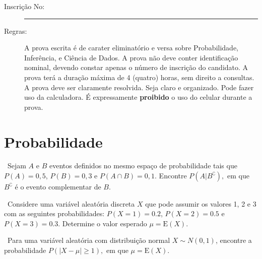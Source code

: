 \documentclass[a4paper,12pt,oneside,onecolumn]{Config/milktest}
\begin{document}
\beb
{
\begin{description}
\item[Inscrição No:] \rule{6cm}{0.4pt}
\item[Regras:] A prova escrita é de carater eliminatório e versa sobre Probabilidade, Inferência, e Ciência de Dados.  A prova não deve conter identificação nominal, devendo constar apenas o número de
inscrição do candidato. A prova terá a duração máxima de 4 (quatro) horas, sem direito a
consultas. A prova deve ser claramente resolvida. Seja claro e organizado. Pode fazer uso da calculadora. É expressamente {\bf proibido} o uso do celular durante a prova.
\end{description}
}
\eeb

\balance


\section*{Probabilidade}




\question \ Sejam $A$ e $B$ eventos definidos no mesmo espaço de probabilidade tais que $P(A) = 0,5$, $P(B) = 0,3$ e $P(A \cap  B ) = 0,1.$  Encontre $P(A| B^\complement),$ em que $B^\complement$ é o evento complementar de $B$.


\bigskip

\question \ Considere uma variável aleatória discreta \( X \) que pode assumir os valores 1, 2 e 3 com as seguintes probabilidades: \( P(X = 1) = 0.2 \),  \( P(X = 2) = 0.5 \) e  \( P(X = 3) = 0.3 \). Determine o valor esperado $\mu=\text{E}(X).$ 

\bigskip

 \question \ Para uma variável aleatória com distribuição normal $X\sim N(0,1)$, encontre a probabilidade $P(| X - \mu | \geqslant 1),$ em que $\mu = \text{E}(X).$
 \bigskip 

\end{document}
